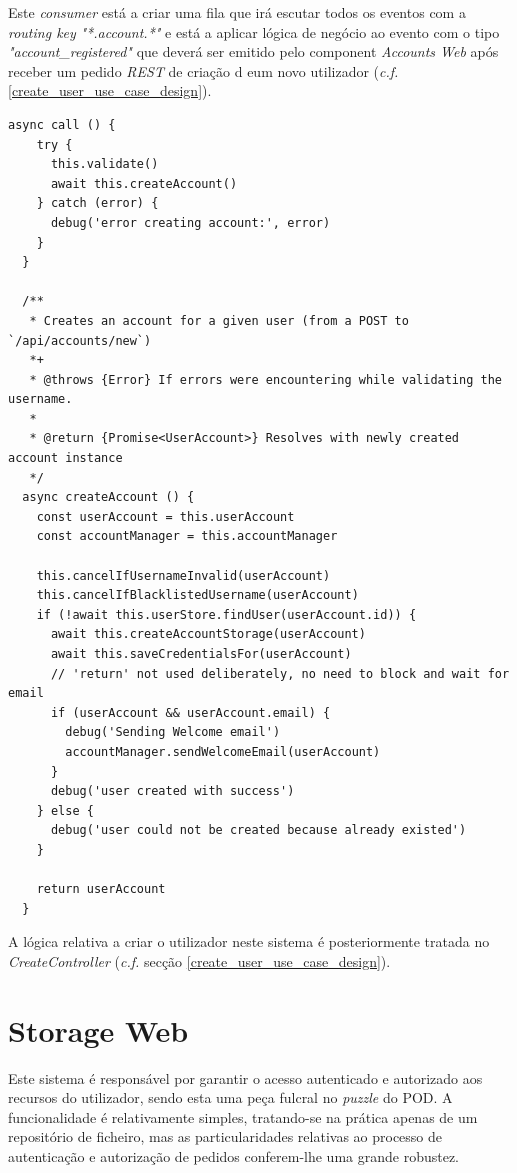 Este \emph{consumer} está a criar uma fila que irá escutar todos os eventos com a \emph{routing key} \emph{"*.account.*"} e está a aplicar lógica de negócio ao evento com o tipo \emph{"account\_registered"} que deverá ser emitido pelo component \emph{Accounts Web} após receber um pedido \emph{REST} de criação d eum novo utilizador  (\emph{c.f.}  \ref{create_user_use_case_design}).

\newpara
\newpara

\begin{lstlisting}[caption={código CreateAccountController}]
async call () {
    try {
      this.validate()
      await this.createAccount()
    } catch (error) {
      debug('error creating account:', error)
    }
  }

  /**
   * Creates an account for a given user (from a POST to `/api/accounts/new`)
   *+
   * @throws {Error} If errors were encountering while validating the username.
   *
   * @return {Promise<UserAccount>} Resolves with newly created account instance
   */
  async createAccount () {
    const userAccount = this.userAccount
    const accountManager = this.accountManager

    this.cancelIfUsernameInvalid(userAccount)
    this.cancelIfBlacklistedUsername(userAccount)
    if (!await this.userStore.findUser(userAccount.id)) {
      await this.createAccountStorage(userAccount)
      await this.saveCredentialsFor(userAccount)
      // 'return' not used deliberately, no need to block and wait for email
      if (userAccount && userAccount.email) {
        debug('Sending Welcome email')
        accountManager.sendWelcomeEmail(userAccount)
      }
      debug('user created with success')
    } else {
      debug('user could not be created because already existed')
    }

    return userAccount
  }

\end{lstlisting}

A lógica relativa a criar o utilizador neste sistema é posteriormente tratada no \emph{CreateController} (\emph{c.f.} secção \ref{create_user_use_case_design}).

\section{Storage Web}
Este sistema é responsável por garantir o acesso autenticado e autorizado aos recursos do utilizador, sendo esta uma peça fulcral no \emph{puzzle} do POD. A funcionalidade é relativamente simples, tratando-se na prática apenas de um repositório de ficheiro, mas as particularidades relativas ao processo de autenticação e autorização de pedidos conferem-lhe uma grande robustez.

